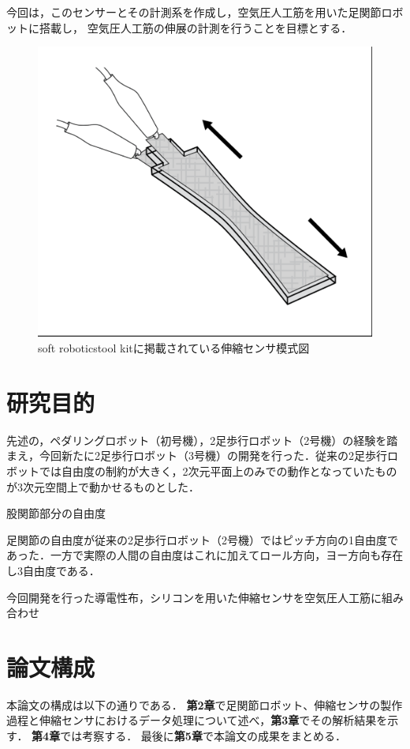 今回は，このセンサーとその計測系を作成し，空気圧人工筋を用いた足関節ロボットに搭載し，
空気圧人工筋の伸展の計測を行うことを目標とする．
\begin{figure}[h]
    \begin{center}
        \includegraphics[width=0.5\columnwidth,bb=0 0 906 785]{Photo/BackGround/MITSoftRobotics.png}
        \caption{soft roboticstool kitに掲載されている伸縮センサ模式図\cite{MITSoftRobot}}
        \label{MITSoftRobot表紙}
    \end{center}
\end{figure}


\section{研究目的}

先述の，ペダリングロボット（初号機），2足歩行ロボット（2号機）の経験を踏まえ，今回新たに2足歩行ロボット（3号機）の開発を行った．従来の2足歩行ロボットでは自由度の制約が大きく，2次元平面上のみでの動作となっていたものが3次元空間上で動かせるものとした．

股関節部分の自由度

足関節の自由度が従来の2足歩行ロボット（2号機）ではピッチ方向の1自由度であった．一方で実際の人間の自由度はこれに加えてロール方向，ヨー方向も存在し3自由度である．

今回開発を行った導電性布，シリコンを用いた伸縮センサを空気圧人工筋に組み合わせ


\section{論文構成}
本論文の構成は以下の通りである．
{\bf 第2章}で足関節ロボット、伸縮センサの製作過程と伸縮センサにおけるデータ処理について述べ，{\bf 第3章}でその解析結果を示す．
{\bf 第4章}では考察する． %
最後に{\bf 第5章}で本論文の成果をまとめる．
